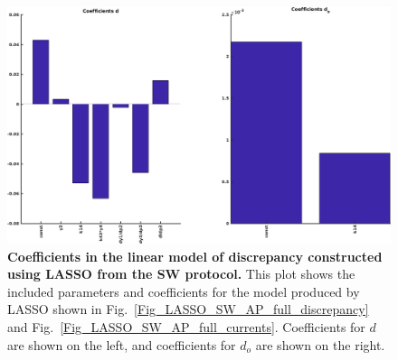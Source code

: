 \documentclass[11pt,a4paper,oneside]{article}
\begin{document}
\begin{figure}[t]
\begin{center}
\includegraphics[scale=0.42]{Figures/LASSO_SW_AP_full_coefficients.png}
\caption{\textbf{Coefficients in the linear model of discrepancy constructed using LASSO from the SW protocol.} This plot shows the included parameters and coefficients for the model produced by LASSO shown in Fig.~\ref{Fig_LASSO_SW_AP_full_discrepancy} and Fig.~\ref{Fig_LASSO_SW_AP_full_currents}. Coefficients for $d$ are shown on the left, and coefficients for $d_o$ are shown on the right.} 
\label{Fig_LASSO_SW_AP_coefficients}
\end{center}
\end{figure}
\end{document}
